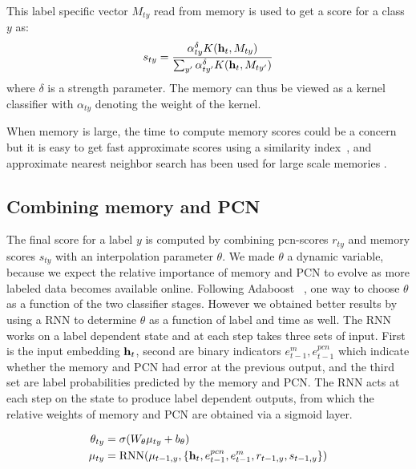 \documentclass[letterpaper]{article} %
\newcommand{\vek}[1]{{\bf {#1}}}
\newcommand{\vh}{{\vek{h}}}
\newcommand{\lmm}{{s}}
\begin{document}
This label specific vector $M_{ty}$ read from memory is used to get a score for a class $y$ as:
\begin{equation}
\label{eq-mem-score}
\lmm_{ty}  = \frac{\alpha_{ty}^\delta K(\vh_t, M_{ty})} { \sum_{y'} \alpha_{ty'}^\delta K(\vh_t, M_{ty'})}
\end{equation}
where $\delta$ is a strength parameter. The memory can thus be viewed as a kernel classifier with $\alpha_{ty}$ denoting the weight of the kernel.


When memory is large, the time to compute memory scores could be a concern but it is easy to get fast approximate scores using a similarity index~\cite{Guo16,kaiser2017}, and approximate nearest neighbor search has been used for large scale memories \cite{RaeHHDSWGL16,chandarSHPGY16}.

\subsection{Combining memory and PCN}
The final score for a label $y$ is computed by combining pcn-scores $r_{ty}$ and memory scores $\lmm_{ty}$ with an interpolation parameter $\theta$.
We made $\theta$ a dynamic variable, because we expect the relative importance of memory and PCN to evolve as more labeled data becomes available online. Following Adaboost ~\cite{Schapire:1999adaboost}, one way to choose $\theta$ as a function of the two classifier stages. However we obtained better results by using a RNN to determine $\theta$ as a function of label and time as well. The RNN works on a label dependent state and at each step takes three sets of input. First is the input embedding $\vh_t$, second are binary indicators $e^m_{t-1}, e^{pcn}_{t-1}$ which indicate whether the memory and PCN had error at the previous output, and the third set are label probabilities predicted by the memory and PCN. The RNN acts at each step on the state to produce label dependent outputs, from which the relative weights of memory and PCN are obtained via a sigmoid layer.

\begin{equation}
\label{eq-comb}
\begin{split}
 \theta_{ty}& = \sigma(W_\theta \mu_{ty} + b_\theta) \\
 \mu_{ty} &=  \text{RNN}(\mu_{t-1,y}, \{\vh_t, e^{pcn}_{t-1},  e^m_{t-1}, r_{t-1,y}, \lmm_{t-1,y}\}) \\
 \end{split}
\end{equation}
\end{document}
